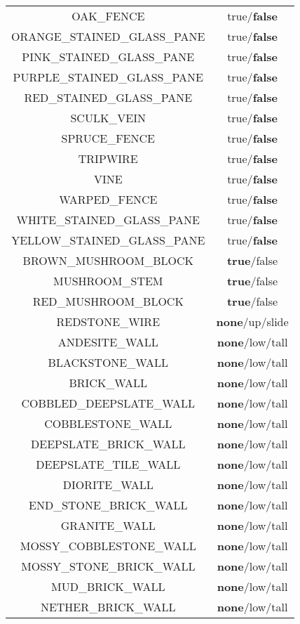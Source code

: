 \begin{longtable}{ |c|c| }
	OAK\_FENCE & true/\textbf{false} \\
	ORANGE\_STAINED\_GLASS\_PANE & true/\textbf{false} \\
	PINK\_STAINED\_GLASS\_PANE & true/\textbf{false} \\
	PURPLE\_STAINED\_GLASS\_PANE & true/\textbf{false} \\
	RED\_STAINED\_GLASS\_PANE & true/\textbf{false} \\
	SCULK\_VEIN & true/\textbf{false} \\
	SPRUCE\_FENCE & true/\textbf{false} \\
	TRIPWIRE & true/\textbf{false} \\
	VINE & true/\textbf{false} \\
	WARPED\_FENCE & true/\textbf{false} \\
	WHITE\_STAINED\_GLASS\_PANE & true/\textbf{false} \\
	YELLOW\_STAINED\_GLASS\_PANE & true/\textbf{false} \\
	\hline
	BROWN\_MUSHROOM\_BLOCK & \textbf{true}/false \\
	MUSHROOM\_STEM & \textbf{true}/false \\
	RED\_MUSHROOM\_BLOCK & \textbf{true}/false \\
	\hline
	REDSTONE\_WIRE & \textbf{none}/up/slide \\
	\hline
	ANDESITE\_WALL & \textbf{none}/low/tall \\
	BLACKSTONE\_WALL & \textbf{none}/low/tall \\
	BRICK\_WALL & \textbf{none}/low/tall \\
	COBBLED\_DEEPSLATE\_WALL & \textbf{none}/low/tall \\
	COBBLESTONE\_WALL & \textbf{none}/low/tall \\
	DEEPSLATE\_BRICK\_WALL & \textbf{none}/low/tall \\
	DEEPSLATE\_TILE\_WALL & \textbf{none}/low/tall \\
	DIORITE\_WALL & \textbf{none}/low/tall \\
	END\_STONE\_BRICK\_WALL & \textbf{none}/low/tall \\
	GRANITE\_WALL & \textbf{none}/low/tall \\
	MOSSY\_COBBLESTONE\_WALL & \textbf{none}/low/tall \\
	MOSSY\_STONE\_BRICK\_WALL & \textbf{none}/low/tall \\
	MUD\_BRICK\_WALL & \textbf{none}/low/tall \\
	NETHER\_BRICK\_WALL & \textbf{none}/low/tall \\

\end{longtable}
